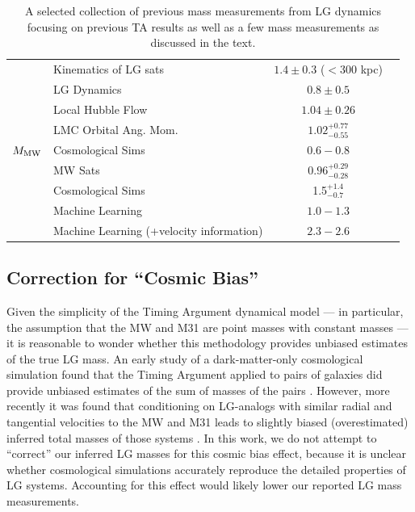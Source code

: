 \documentclass[twocolumn]{aastex631}
\newcommand{\mmw}{\ensuremath{M_{\rm MW}}}
\begin{document}
\begin{table}
\begin{tabular}{clc|c}
    \hline
    \multirow{9}{*}{\mmw}&  Kinematics of LG sats & $1.4 \pm 0.3$ ($<$300 kpc)
    & \cite{Watkins2010}\\
    & LG Dynamics &$0.8\pm0.5$ & \cite{Diaz2014}\\
    & Local Hubble Flow & $1.04 \pm 0.26$ & \cite{Penarrubia2016}\\
    & LMC Orbital Ang. Mom. & $1.02^{+0.77}_{-0.55}$ & \cite{Patel2017b}\\
    & Cosmological Sims & $0.6-0.8$ & \cite{Carlesi2017}\\
    & MW Sats & $0.96^{+0.29}_{-0.28}$ & \cite{Patel2018}\\
    & Cosmological Sims & 1.5$^{+1.4}_{-0.7}$ & \cite{Zhai2020} \\
    & Machine Learning & $1.0-1.3$ & \cite{Villanueva-Domingo2021}\\
    & Machine Learning (+velocity information) & $2.3-2.6$ & 
    \cite{Villanueva-Domingo2021}\\
  \hline\hline
  \end{tabular}
  \caption{\label{table:masses}A selected collection of previous mass
  measurements from LG dynamics focusing on previous TA results as well as a few
  mass measurements as discussed in the text.}
\end{table}


\subsection{Correction for ``Cosmic Bias''}
Given the simplicity of the Timing Argument dynamical model --- in particular,
the assumption that the MW and M31 are point masses with constant masses --- it
is reasonable to wonder whether this methodology provides unbiased estimates of
the true LG mass.
An early study of a dark-matter-only cosmological simulation found that the
Timing Argument applied to pairs of galaxies did provide unbiased estimates of
the sum of masses of the pairs \citep{LiWhite2008}.
However, more recently it was found that conditioning on LG-analogs with similar
radial and tangential velocities to the MW and M31 leads to slightly biased
(overestimated) inferred total masses of those systems \citep{Gonzalez2014,
Hartl2021}.
In this work, we do not attempt to ``correct'' our inferred LG masses for this
cosmic bias effect, because it is unclear whether cosmological simulations
accurately reproduce the detailed properties of LG systems.
Accounting for this effect would likely lower our reported LG mass measurements.
\end{document}
